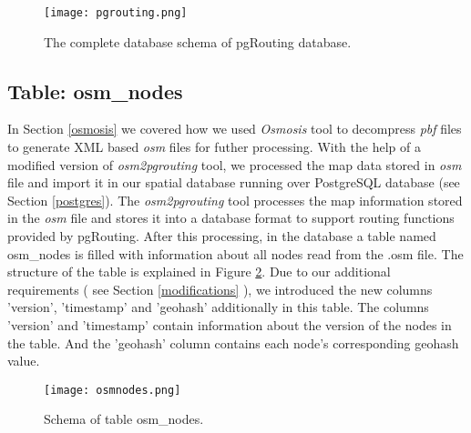 \begin{figure}
\centering
\texttt{[image: pgrouting.png]}
\caption{The complete database schema of pgRouting database.}
\label{fg:db}
\end{figure}



\subsection{Table: osm{\_}nodes}
In Section \ref{osmosis} we covered how we used \textit{Osmosis} tool to decompress \textit{pbf} files to generate XML based \textit{osm} files for futher processing. With the help of a modified version of \textit{osm2pgrouting} tool, we processed the map data stored in \textit{osm} file and import it in our spatial database running over PostgreSQL database (see Section \ref{postgres}). The \textit{osm2pgrouting} tool processes the map information stored in the \textit{osm} file and stores it into a database format to support routing functions provided by pgRouting. After this processing, in the database a table named osm{\_}nodes is filled with information about all nodes read from the .osm file. The structure of the table is explained in Figure \ref{fg:osmnodes}. Due to our additional requirements ( see Section \ref{modifications} ), we introduced the new columns 'version', 'timestamp' and 'geohash' additionally in this table. The columns 'version' and 'timestamp' contain information about the version of the nodes in the table. And the 'geohash' column contains each node's corresponding geohash value. 
\begin{figure}
\centering
\texttt{[image: osmnodes.png]}
\caption{Schema of table osm{\_}nodes.}
\label{fg:osmnodes}
\end{figure}

